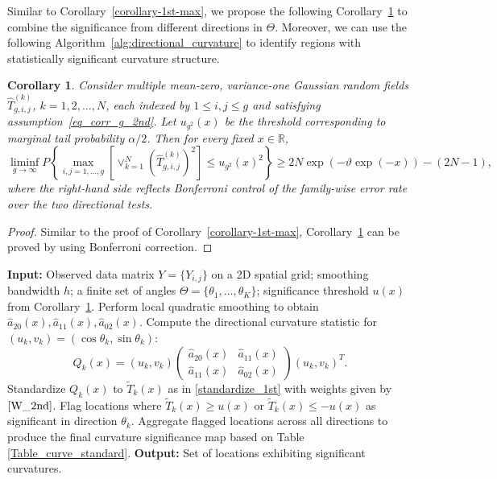 \documentclass{article}
\def\ha{\hat{a}}
\newtheorem{corollary}{Corollary}[theorem]
\begin{document}
Similar to Corollary~\ref{corollary-1st-max}, we propose the following Corollary~\ref{corollary-2nd-max} to combine the significance from different directions in $\Theta$. Moreover, we can use the following Algorithm~\ref{alg:directional_curvature}  to identify regions with statistically significant curvature structure.

\begin{corollary}
	\label{corollary-2nd-max}
	Consider multiple mean-zero, variance-one Gaussian random fields  
	\(\hat{T}^{(k)}_{g,i,j}\), $k=1,2,...,N$, each indexed by \(1 \le i,j \le g\) and satisfying
	assumption~\eqref{eq_corr_g_2nd}. Let \(u_{g^2}(x)\) be the threshold corresponding to marginal tail probability \(\alpha/2\). Then for every fixed \(x \in \mathbb{R}\),
	\[
	\liminf_{g \to \infty}
	P\left\{
	\max_{i,j = 1,\dots, g}
	\left[
	\vee_{k=1}^N (\hat{T}^{(k)}_{g,i,j})^2
	\right]
	\le u_{g^2}(x)^2
	\right\}
	\ge 2N\exp(-\vartheta \exp(-x))-(2N-1),
	\]
	where the right-hand side reflects Bonferroni control of the family-wise error rate over the two directional tests.
\end{corollary}
\begin{proof}
	Similar to the proof of Corollary~\ref{corollary-1st-max}, Corollary~\ref{corollary-2nd-max} can be proved by using Bonferroni correction. 
\end{proof}




\begin{algorithm}[H]
	\caption{Curvature Structure Investigation Procedure}
	\label{alg:directional_curvature}
	\begin{algorithmic}[1]
		\State \textbf{Input:} Observed data matrix $Y = \{Y_{i,j}\}$ on a 2D spatial grid; smoothing bandwidth $h$; a finite set of angles $\Theta = \{\theta_1, \ldots, \theta_K\}$; significance threshold $u(x)$ from Corollary~\ref{corollary-2nd-max}.
		\State Perform local quadratic smoothing to obtain $\ha_{20}(x),\ha_{11}(x),\ha_{02}(x)$.
		\State Compute the directional curvature statistic for $(u_k, v_k) = (\cos \theta_k, \sin \theta_k)$:
		\[
		Q_k(x) = (u_k, v_k)
		\begin{pmatrix}
			\ha_{20}(x) & \ha_{11}(x) \\
			\ha_{11}(x) & \ha_{02}(x)
		\end{pmatrix}
		(u_k, v_k)^T.
		\]
		\State Standardize $Q_k(x)$ to $\tilde{T}_k(x)$ as in \eqref{standardize_1st} with weights given by $\eqref{W_2nd}$.   %
		\State  Flag locations where $\tilde{T}_k(x) \geq u(x)$ or $\tilde{T}_k(x) \leq -u(x)$ as significant in direction $\theta_k$.
		\EndFor
		\State Aggregate flagged locations across all directions to produce the final curvature significance map based on Table \ref{Table_curve_standard}.
		\State \textbf{Output:} Set of locations exhibiting significant curvatures.
	\end{algorithmic}
\end{algorithm}
\end{document}
